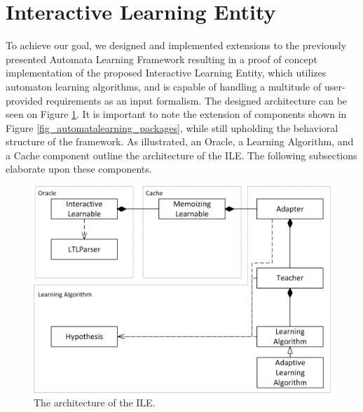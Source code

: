 \smallskip

\section{Interactive Learning Entity} \label{sec_interactivelearningframework}

To achieve our goal, we designed and implemented extensions to the previously presented Automata Learning Framework resulting in a proof of concept implementation of the proposed Interactive Learning Entity, which utilizes automaton learning algorithms, and is capable of handling a multitude of user-provided requirements as an input formalism. The designed architecture can be seen on Figure \ref{fig_automatonlearning_overview}. It is important to note the extension of components shown in Figure \ref{fig_automatalearning_packages}, while still upholding the behavioral structure of the framework. As illustrated, an Oracle, a Learning Algorithm, and a Cache component outline the architecture of the ILE. The following subsections elaborate upon these components.

\begin{figure}[!ht] 
	\centering
	\includegraphics[width=120mm, keepaspectratio]{figures/automatalearning_overview.png}
	\caption{The architecture of the ILE.} 
	\label{fig_automatonlearning_overview}
\end{figure}

